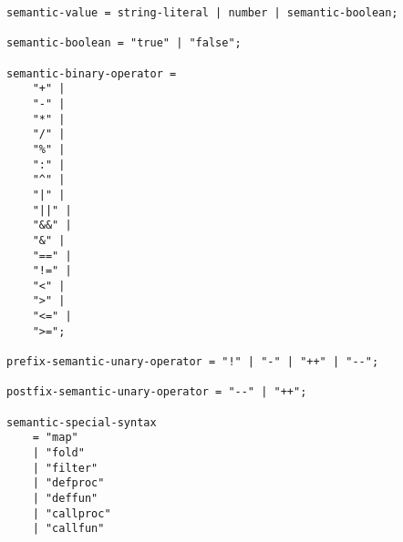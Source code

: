 \begin{verbatim}
semantic-value = string-literal | number | semantic-boolean;

semantic-boolean = "true" | "false";

semantic-binary-operator = 
    "+" |
    "-" |
    "*" |
    "/" |
    "%" |
    ":" |
    "^" |
    "|" |
    "||" |
    "&&" |
    "&" |
    "==" |
    "!=" |
    "<" |
    ">" |
    "<=" |
    ">=";

prefix-semantic-unary-operator = "!" | "-" | "++" | "--";

postfix-semantic-unary-operator = "--" | "++";

semantic-special-syntax 
    = "map"
    | "fold"
    | "filter"
    | "defproc"
    | "deffun"
    | "callproc"
    | "callfun"

\end{verbatim}

